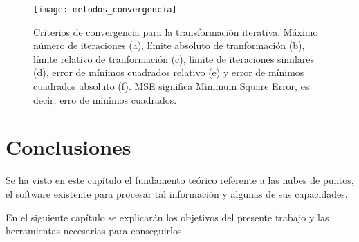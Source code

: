 \begin{figure}
\centering
\texttt{[image: metodos\_convergencia]}
\caption{Criterios de convergencia para la transformación iterativa. Máximo número de iteraciones (a), límite absoluto de tranformación (b), límite relativo de tranformación (c), límite de iteraciones similares (d), error de mínimos cuadrados relativo (e) y error de mínimos cuadrados absoluto (f). MSE significa Minimum Square Error, es decir, erro de mínimos cuadrados. }\label{fig:metodos_convergencia}
\end{figure}


\section{Conclusiones}
Se ha visto en este capítulo el fundamento teórico referente a las nubes de puntos, el software existente para procesar tal información y algunas de sus capacidades.

En el siguiente capítulo se explicarán los objetivos del presente trabajo y las herramientas necesarias para conseguirlos.







